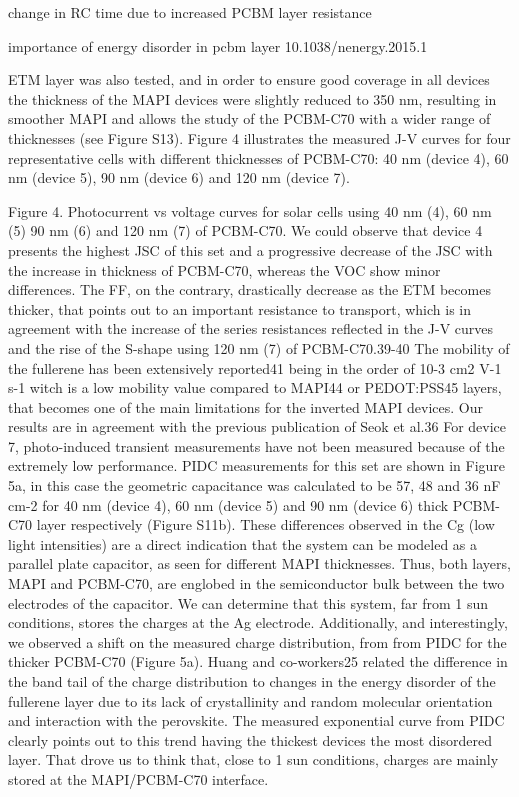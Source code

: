 change in RC time due to increased PCBM layer resistance \cite{Wheeler2017}

importance of energy disorder in pcbm layer 10.1038/nenergy.2015.1





ETM layer was also tested, and in order to ensure good coverage in all devices the thickness of the MAPI devices were slightly reduced to 350 nm, resulting in smoother MAPI and allows the study of the PCBM-C70 with a wider range of thicknesses (see Figure S13). 
Figure 4 illustrates the measured J-V curves for four representative cells with different thicknesses of PCBM-C70: 40 nm (device 4), 60 nm (device 5), 90 nm (device 6) and 120 nm (device 7).

Figure 4. Photocurrent vs voltage curves for solar cells using 40 nm (4), 60 nm (5) 90 nm (6) and 120 nm (7) of PCBM-C70.
We could observe that device 4 presents the highest JSC of this set and a progressive decrease of the JSC with the increase in thickness of PCBM-C70, whereas the VOC show minor differences. The FF, on the contrary, drastically decrease as the ETM becomes thicker, that points out to an important resistance to transport, which is in agreement with the increase of the series resistances reflected in the J-V curves and the rise of the S-shape using 120 nm (7) of PCBM-C70.39-40 The mobility of the fullerene has been extensively reported41 being in the order of 10-3 cm2 V-1 s-1 witch is a low mobility value compared to MAPI44 or PEDOT:PSS45 layers, that becomes one of the main limitations for the inverted MAPI devices. Our results are in agreement with the previous publication of Seok et al.36
For device 7, photo-induced transient measurements have not been measured because of the extremely low performance. PIDC measurements for this set are shown in Figure 5a, in this case the geometric capacitance was calculated to be 57, 48 and 36 nF cm-2 for 40 nm (device 4), 60 nm (device 5) and 90 nm (device 6) thick PCBM-C70 layer respectively (Figure S11b). These differences observed in the Cg (low light intensities) are a direct indication that the system can be modeled as a parallel plate capacitor, as seen for different MAPI thicknesses. Thus, both layers, MAPI and PCBM-C70, are englobed in the semiconductor bulk between the two electrodes of the capacitor. We can determine that this system, far from 1 sun conditions, stores the charges at the Ag electrode. 
Additionally, and interestingly, we observed a shift on the measured charge distribution, from from PIDC for the thicker PCBM-C70 (Figure 5a). Huang and co-workers25 related the difference in the band tail of the charge distribution to changes in the energy disorder of the fullerene layer due to its lack of crystallinity and random molecular orientation and interaction with the perovskite. The measured exponential curve from PIDC clearly points out to this trend having the thickest devices the most disordered layer. That drove us to think that, close to 1 sun conditions, charges are mainly stored at the MAPI/PCBM-C70 interface.


